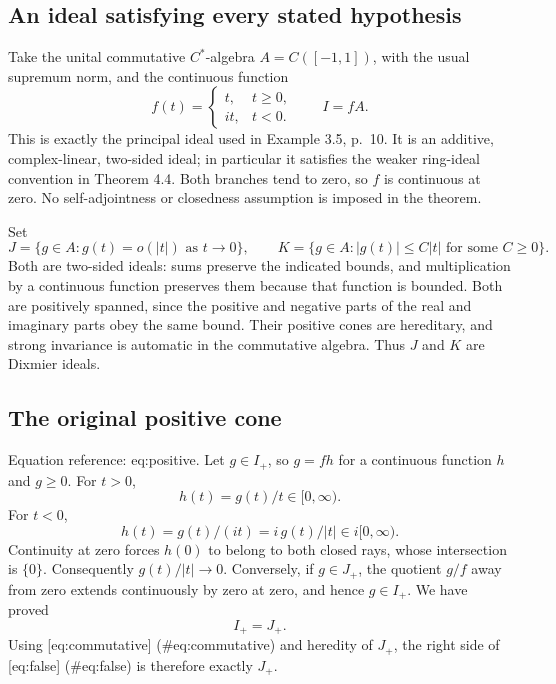 \documentclass[10pt]{article}
\begin{document}
\subsection*{An ideal satisfying every stated hypothesis}
Take the unital commutative \(C^*\)-algebra \(A=C([-1,1])\), with the usual supremum norm, and the continuous function \[f(t)=
 \begin{cases}
 t,&t\geq0,\\
 it,&t<0.
 \end{cases}
 \qquad I=fA.\] This is exactly the principal ideal used in Example 3.5, p. 10. It is an additive, complex-linear, two-sided ideal; in particular it satisfies the weaker ring-ideal convention in Theorem 4.4. Both branches tend to zero, so \(f\) is continuous at zero. No self-adjointness or closedness assumption is imposed in the theorem.\par
Set \[J=\{g\in A:g(t)=o(|t|)\text{ as }t\to0\},\qquad
 K=\{g\in A:|g(t)|\leq C|t|\text{ for some }C\geq0\}.\] Both are two-sided ideals: sums preserve the indicated bounds, and multiplication by a continuous function preserves them because that function is bounded. Both are positively spanned, since the positive and negative parts of the real and imaginary parts obey the same bound. Their positive cones are hereditary, and strong invariance is automatic in the commutative algebra. Thus \(J\) and \(K\) are Dixmier ideals.\par
\subsection*{The original positive cone}
Equation reference: eq:positive. Let \(g\in I_+\), so \(g=fh\) for a continuous function \(h\) and \(g\geq0\). For \(t>0\), \[h(t)=g(t)/t\in[0,\infty).\] For \(t<0\), \[h(t)=g(t)/(it)=i\,g(t)/|t|\in i[0,\infty).\] Continuity at zero forces \(h(0)\) to belong to both closed rays, whose intersection is \(\{0\}\). Consequently \(g(t)/|t|\to0\). Conversely, if \(g\in J_+\), the quotient \(g/f\) away from zero extends continuously by zero at zero, and hence \(g\in I_+\). We have proved \[
 I_+=J_+.\] Using [eq:commutative] (\#eq:commutative) and heredity of \(J_+\), the right side of [eq:false] (\#eq:false) is therefore exactly \(J_+\).\par
\end{document}
